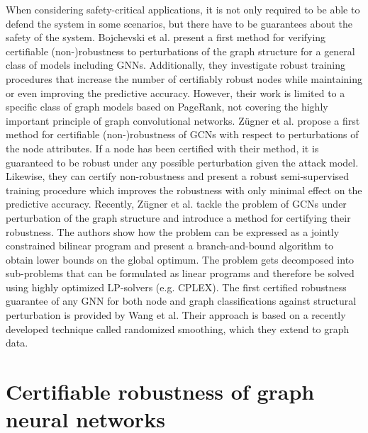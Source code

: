\documentclass[a4paper,preprint]{sig-alternate}
\begin{document}
When considering safety-critical applications, it is not only required to be able to defend the system in some scenarios, but there
have to be guarantees about the safety of the system.
Bojchevski et al. \cite{bojchevski2019certifiable} present a first method for verifying certifiable
(non-)robustness to perturbations of the graph structure for a general class of models including GNNs. Additionally, they investigate robust 
training procedures that increase the number of certifiably robust nodes while maintaining or even improving the predictive accuracy.
However, their work is limited to a specific class of graph models based on PageRank, not covering the highly important principle of graph convolutional
networks. \cite{10.1145/3394486.3403217}
Zügner et al. \cite{Zuegner_2019} propose a first method for certifiable (non-)robustness of GCNs with respect to 
perturbations of the node attributes. If a node has been certified with their method, it is guaranteed to be robust under any
possible perturbation given the attack model. Likewise, they can certify non-robustness and present a robust semi-supervised training
procedure which improves the robustness with only minimal effect on the predictive accuracy.
Recently, Zügner et al. \cite{10.1145/3394486.3403217} tackle the problem of GCNs under perturbation of the graph structure and introduce a method
for certifying their robustness. The authors show how the problem can be expressed as a jointly constrained bilinear program and
present a branch-and-bound algorithm to obtain lower bounds on the global optimum. The problem gets decomposed into sub-problems that can
be formulated as linear programs and therefore be solved using highly optimized LP-solvers (e.g. CPLEX).
The first certified robustness guarantee of any GNN for both node and graph classifications against structural perturbation
is provided by Wang et al.\cite{Wang_2020} Their approach is based on a recently developed technique called randomized smoothing,
which they extend to graph data.

\section{Certifiable robustness of graph neural networks}
\label{sec:main_section}
\end{document}

